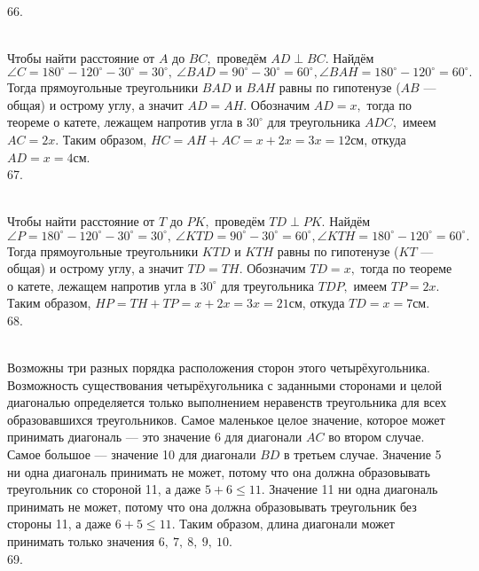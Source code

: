 66. \begin{figure}[ht!]
\end{figure}\\
Чтобы найти расстояние от $A$ до $BC,$ проведём $AD\perp BC.$ Найдём $\angle C=180^\circ-120^\circ-30^\circ=30^\circ,\ \angle BAD=90^\circ-30^\circ=60^\circ, \angle BAH=180^\circ-120^\circ=60^\circ.$ Тогда прямоугольные треугольники $BAD$ и $BAH$ равны по гипотенузе ($AB$ --- общая) и острому углу, а значит $AD=AH.$ Обозначим $AD=x,$ тогда по теореме о катете, лежащем напротив угла в $30^\circ$ для треугольника $ADC,$ имеем $AC=2x.$ Таким образом, $HC=AH+AC=x+2x=3x=12$см, откуда $AD=x=4$см.\\
67. \begin{figure}[ht!]
\end{figure}\\
Чтобы найти расстояние от $T$ до $PK,$ проведём $TD\perp PK.$ Найдём $\angle P=180^\circ-120^\circ-30^\circ=30^\circ,\ \angle KTD=90^\circ-30^\circ=60^\circ, \angle KTH=180^\circ-120^\circ=60^\circ.$ Тогда прямоугольные треугольники $KTD$ и $KTH$ равны по гипотенузе ($KT$ --- общая) и острому углу, а значит $TD=TH.$ Обозначим $TD=x,$ тогда по теореме о катете, лежащем напротив угла в $30^\circ$ для треугольника $TDP,$ имеем $TP=2x.$ Таким образом, $HP=TH+TP=x+2x=3x=21$см, откуда $TD=x=7$см.\\
68. \begin{figure}[ht!]
\end{figure}\\
Возможны три разных порядка расположения сторон этого четырёхугольника. Возможность существования четырёхугольника с заданными сторонами и целой диагональю определяется только выполнением неравенств треугольника для всех образовавшихся треугольников. Самое маленькое целое значение, которое может принимать диагональ --- это значение 6 для диагонали $AC$ во втором случае. Самое большое --- значение 10 для диагонали $BD$ в третьем случае. Значение 5 ни одна диагональ принимать не может, потому что она должна образовывать треугольник со стороной 11, а даже $5+6\leqslant11.$ Значение 11 ни одна диагональ принимать не может, потому что она должна образовывать треугольник без стороны 11, а даже $6+5\leqslant11.$ Таким образом, длина диагонали может принимать только значения $6,\ 7,\ 8,\ 9,\ 10.$\\
69. \begin{figure}[ht!]
\end{figure}\\
